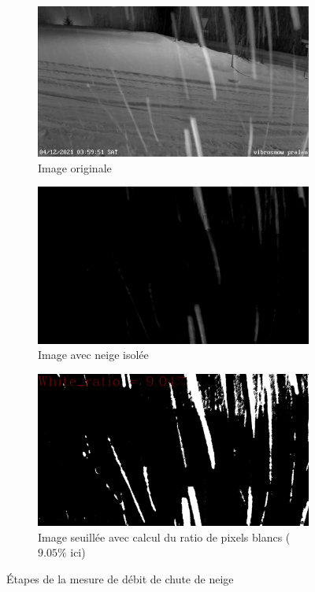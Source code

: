\begin{figure}[H]
    \begin{subfigure}{.45\textwidth}
        \includegraphics[width=\linewidth]{Images/computer_vision/snowfall/original.png}
        \caption{Image originale}
        \label{fig:Snowfall_original}
    \end{subfigure}
    \hfill
    \begin{subfigure}{.45\textwidth}
        \includegraphics[width=\linewidth]{Images/computer_vision/snowfall/noise.png}
        \caption{Image avec neige isolée}
        \label{fig:Snowfall_noise}
    \end{subfigure}
    \hfill
    \centering
    \begin{subfigure}{.45\textwidth}
        \includegraphics[width=\linewidth]{Images/computer_vision/snowfall/snowfall.png}
        \caption{Image seuillée avec calcul du ratio de pixels blancs ($9.05\%$ ici)}
        \label{fig:Snowfall_thres}
    \end{subfigure}
    \caption{Étapes de la mesure de débit de chute de neige}
    \label{fig:Snowfall_algorithm}
\end{figure}
